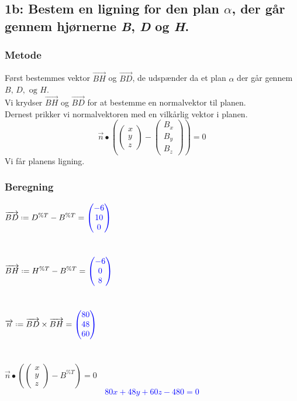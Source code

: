 \documentclass[../main.tex]{subfiles}
\begin{document}
\subsection*{1b: Bestem en ligning for den plan \(\alpha\), der går gennem hjørnerne \textit{B}, \textit{D} og \textit{H}. }
    \subsubsection*{Metode}
        Først bestemmes vektor \(\overrightarrow{BH}\) og \(\overrightarrow{BD}\), de udspænder da et plan \(\alpha\) der går gennem \(B,\, D,\text{ og } H\).\\
        Vi krydser \(\overrightarrow{BH}\) og \(\overrightarrow{BD}\) for at bestemme en normalvektor til planen.\\
        Dernest prikker vi normalvektoren med en vilkårlig vektor i planen.
        \[\overrightarrow{n}\bullet \left(\begin{pmatrix} x \\ y \\ z \end{pmatrix}-\begin{pmatrix}B_x \\B_y\\B_z \end{pmatrix}\right)=0\]
        Vi får planens ligning.
    \subsubsection*{Beregning}
        \(\overrightarrow{BD} \defeq D^{\%T}-B^{\%T} = \textcolor{blue}{\begin{pmatrix} -6 \\ 10 \\ 0\end{pmatrix}}\)\\\\\\
        \(\overrightarrow{BH} \defeq H^{\%T}-B^{\%T} = \textcolor{blue}{\begin{pmatrix} -6 \\ 0 \\ 8\end{pmatrix}}\)\\\\\\
        \(\overrightarrow{n} \defeq \overrightarrow{BD} \times \overrightarrow{BH} = \textcolor{blue}{\begin{pmatrix} 80 \\ 48 \\ 60\end{pmatrix}}\)\\\\\\
        \(\overrightarrow{n} \bullet \left(\begin{pmatrix} x \\ y\\ z\end{pmatrix} - B^{\%T}\right)=0\)
        \textcolor{blue}{\[80x+48y+60z-480=0\]}
\end{document}
